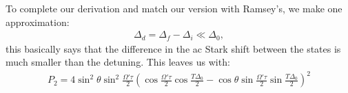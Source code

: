 \documentclass{article}
\begin{document}
To complete our derivation and match our version with Ramsey's, we make one approximation:
\begin{align}
\Delta_d = \Delta_f - \Delta_i \ll \Delta_0,
\end{align}
this basically says that the difference in the ac Stark shift between the states is much smaller than the detuning. This leaves us with:
\begin{align}
\boxed{P_2 = 4\sin^2\theta\sin^2\frac{\Omega'\tau}{2}\left(\cos\frac{\Omega'\tau}{2}\cos\frac{T\Delta_0}{2} - \cos\theta\sin\frac{\Omega'\tau}{2}\sin\frac{T\Delta_0}{2} \right) ^2}
\end{align}
\end{document}
